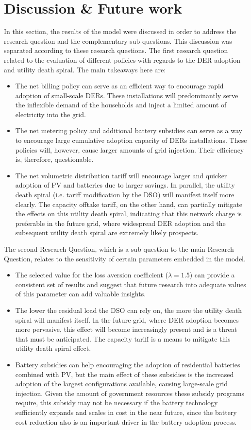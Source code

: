 \section{Discussion \& Future work} \label{future}
In this section, the results of the model were discussed in order to address the research question and the complementary sub-questions. This discussion was separated according to these research questions. The first research question related to the evaluation of different policies with regards to the DER adoption and utility death spiral. The main takeaways here are:
\begin{itemize}
\item The net billing policy can serve as an efficient way to encourage rapid adoption of small-scale DERs. These installations will predominantly serve the inflexible demand of the households and inject a limited amount of electricity into the grid.
\item The net metering policy and additional battery subsidies can serve as a way to encourage large cumulative adoption capacity of DERs installations. These policies will, however, cause larger amounts of grid injection. Their efficiency is, therefore, questionable.
\item The net volumetric distribution tariff will encourage larger and quicker adoption of PV and batteries due to larger savings. In parallel, the utility death spiral (i.e. tariff modification by the DSO) will manifest itself more clearly. The capacity offtake tariff, on the other hand, can partially mitigate the effects on this utility death spiral, indicating that this network charge is preferable in the future grid, where widespread DER adoption and the subsequent utility death spiral are extremely likely prospects. 
\end{itemize}
The second Research Question, which is a sub-question to the main Research Question, relates to the sensitivity of certain parameters embedded in the model. 
\begin{itemize}
\item The selected value for the loss aversion coefficient ($\lambda = 1.5$)  can provide a consistent set of results and suggest that future research into adequate values of this parameter can add valuable insights. 
\item The lower the residual load the DSO can rely on, the more the utility death spiral will manifest itself. In the future grid, where DER adoption becomes more pervasive, this effect will become increasingly present and is a threat that must be anticipated. The capacity tariff is a means to mitigate this utility death spiral effect.
\item Battery subsidies can help encouraging the adoption of residential batteries combined with PV, but the main effect of these subsidies is the increased adoption of the largest configurations available, causing large-scale grid injection. Given the amount of government resources these subsidy programs require, this subsidy may not be necessary if the battery technology sufficiently expands and scales in cost in the near future, since the battery cost reduction also is an important driver in the battery adoption process. 
\end{itemize}
